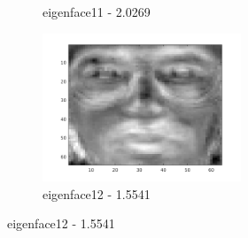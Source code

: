 \documentclass[a4paper]{article}
\begin{document}
\begin{figure}[H]
\begin{subfigure}[c]{0.24\textwidth}
        \caption{eigenface11 - 2.0269}
        \label{subfig:ex2_x11}
    \end{subfigure}
    \begin{subfigure}[c]{0.24\textwidth}
        \centering
        \includegraphics[width=0.65\textwidth]{images/ex2_x12.png}
        \caption{eigenface12 - 1.5541}
        \label{subfig:ex2_x12}
    \end{subfigure}


\end{figure}
\end{document}
